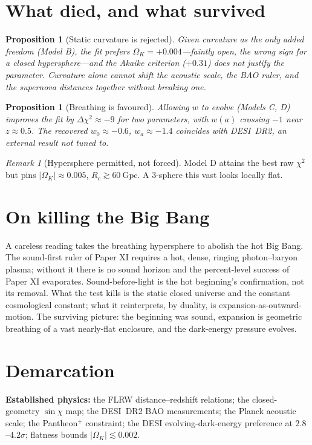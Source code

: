 \documentclass[11pt]{article}
\newtheorem{proposition}[theorem]{Proposition}
\theoremstyle{remark}
\newtheorem{remark}[theorem]{Remark}
\newcommand{\OmK}{\Omega_K}
\newcommand{\Gpc}{\mathrm{Gpc}}
\begin{document}
\section{What died, and what survived}
\begin{proposition}[Static curvature is rejected]
Given curvature as the only added freedom (Model B), the fit prefers $\OmK = +0.004$---faintly open, the wrong sign for a closed hypersphere---and the Akaike criterion ($+0.31$) does not justify the parameter. Curvature alone cannot shift the acoustic scale, the BAO ruler, and the supernova distances together without breaking one.
\end{proposition}
\begin{proposition}[Breathing is favoured]
Allowing $w$ to evolve (Models C, D) improves the fit by $\Delta\chi^2 \approx -9$ for two parameters, with $w(a)$ crossing $-1$ near $z \approx 0.5$. The recovered $w_0 \approx -0.6$, $w_a \approx -1.4$ coincides with DESI~DR2, an external result not tuned to.
\end{proposition}
\begin{remark}[Hypersphere permitted, not forced]
Model D attains the best raw $\chi^2$ but pins $|\OmK| \approx 0.005$, $R_c \gtrsim 60\ \Gpc$. A $3$-sphere this vast looks locally flat.
\end{remark}
\section{On killing the Big Bang}
A careless reading takes the breathing hypersphere to abolish the hot Big Bang. The sound-first ruler of Paper XI requires a hot, dense, ringing photon--baryon plasma; without it there is no sound horizon and the percent-level success of Paper XI evaporates. Sound-before-light is the hot beginning's confirmation, not its removal. What the test kills is the static closed universe and the constant cosmological constant; what it reinterprets, by duality, is expansion-as-outward-motion. The surviving picture: the beginning was sound, expansion is geometric breathing of a vast nearly-flat enclosure, and the dark-energy pressure evolves.
\section{Demarcation}
\textbf{Established physics:} the FLRW distance--redshift relations; the closed-geometry $\sin\chi$ map; the DESI~DR2 BAO measurements; the Planck acoustic scale; the Pantheon$^+$ constraint; the DESI evolving-dark-energy preference at $2.8$--$4.2\sigma$; flatness bounds $|\OmK| \lesssim 0.002$.
\end{document}
